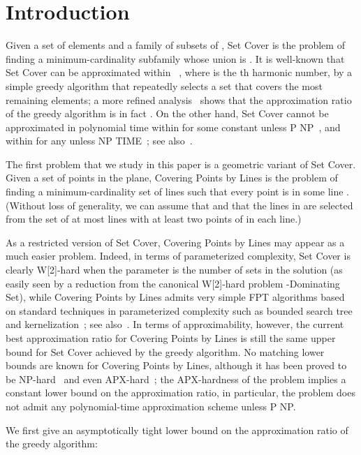 \documentclass[letterpaper,11pt]{article}
\begin{document}
\section{Introduction}

Given a set  of  elements and a family  of  subsets of ,
{\sc Set Cover} is the problem of finding a minimum-cardinality subfamily
 whose union is .
It is well-known that
{\sc Set Cover} can be approximated within
~\cite{Jo74,Lo75,Ch79},
where  is the th harmonic number,
by a simple greedy algorithm that
repeatedly selects a set that covers the most remaining elements;
a more refined analysis~\cite{Sl97} shows that the approximation ratio
of the greedy algorithm is in fact .
On the other hand, {\sc Set Cover} 
cannot be approximated in polynomial time
within  for some constant 
unless P  NP~\cite{RS97},
and
within 
for any 
unless NP  TIME~\cite{Fe98};
see also~\cite{AMS06,LY94}.

The first problem that we study in this paper
is a geometric variant of {\sc Set Cover}.
Given a set  of  points in the plane,
{\sc Covering Points by Lines}
is the problem of finding a minimum-cardinality set  of lines
such that every point  is in some line .
(Without loss of generality,
we can assume that  and that the lines in  are selected from
the set  of at most  lines
with at least two points of  in each line.)

As a restricted version of {\sc Set Cover},
{\sc Covering Points by Lines} may appear as a much easier problem.
Indeed, in terms of parameterized complexity, {\sc Set Cover} is clearly
W[2]-hard when the parameter is the number  of sets in the solution
(as easily seen by a reduction from the canonical W[2]-hard problem
-{\sc Dominating Set}),
while {\sc Covering Points by Lines} 
admits very simple FPT algorithms based on standard
techniques in parameterized complexity such as bounded search tree
and kernelization~\cite{LM05}; see also~\cite{GL06,WLC10}.
In terms of approximability, however,
the current best approximation ratio for {\sc Covering Points by Lines} is still
the same  upper bound for {\sc Set Cover}
achieved by the greedy algorithm.
No matching lower bounds are known for {\sc Covering Points by Lines},
although it has been proved to be NP-hard~\cite{MT82}
and even APX-hard~\cite{BHN01,KAR00};
the APX-hardness of the problem implies a constant lower bound
on the approximation ratio, in particular, the problem
does not admit any polynomial-time approximation scheme unless P  NP.

We first give an asymptotically tight lower bound
on the approximation ratio of the greedy algorithm:
\end{document}

